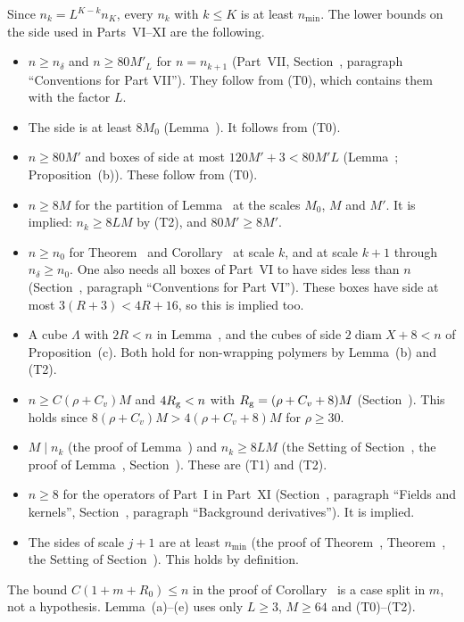\begin{detail}
\begin{step}
Since $n_k=L^{K-k}n_K$, every $n_k$ with $k\le K$ is at least $n_{\min}$. The lower bounds on the side used in Parts~VI--XI are the following.
\begin{itemize}
\item $n\ge n_\delta$ and $n\ge80M'_L$ for $n=n_{k+1}$ (Part~VII, Section~, paragraph ``Conventions for Part VII''). They follow from (T0), which contains them with the factor $L$.
\item The side is at least $8M_0$ (Lemma~). It follows from (T0).
\item $n\ge80M'$ and boxes of side at most $120M'+3<80M'L$ (Lemma~; Proposition~(b)). These follow from (T0).
\item $n\ge8M$ for the partition of Lemma~ at the scales $M_0$, $M$ and $M'$. It is implied: $n_k\ge8LM$ by (T2), and $80M'\ge8M'$.
\item $n\ge n_0$ for Theorem~ and Corollary~ at scale $k$, and at scale $k+1$ through $n_\delta\ge n_0$. One also needs all boxes of Part~VI to have sides less than $n$ (Section~, paragraph ``Conventions for Part VI''). These boxes have side at most $3(R+3)<4R+16$, so this is implied too.
\item A cube $\Lambda$ with $2R<n$ in Lemma~, and the cubes of side $2\operatorname{diam}X+8<n$ of Proposition~(c). Both hold for non-wrapping polymers by Lemma~(b) and (T2).
\item $n\ge C(\rho+C_v)M$ and $4R_{\rm g}<n$ with $R_{\rm g}=(\rho+C_v+8)M$ (Section~). This holds since $8(\rho+C_v)M>4(\rho+C_v+8)M$ for $\rho\ge30$.
\item $M\mid n_k$ (the proof of Lemma~) and $n_k\ge8LM$ (the Setting of Section~, the proof of Lemma~, Section~). These are (T1) and (T2).
\item $n\ge8$ for the operators of Part~I in Part~XI (Section~, paragraph ``Fields and kernels'', Section~, paragraph ``Background derivatives''). It is implied.
\item The sides of scale $j+1$ are at least $n_{\min}$ (the proof of Theorem~, Theorem~, the Setting of Section~). This holds by definition.
\end{itemize}
The bound $C(1+m+R_0)\le n$ in the proof of Corollary~ is a case split in $m$, not a hypothesis. Lemma~(a)--(e) uses only $L\ge3$, $M\ge64$ and (T0)--(T2).
\end{step}
\end{detail}

